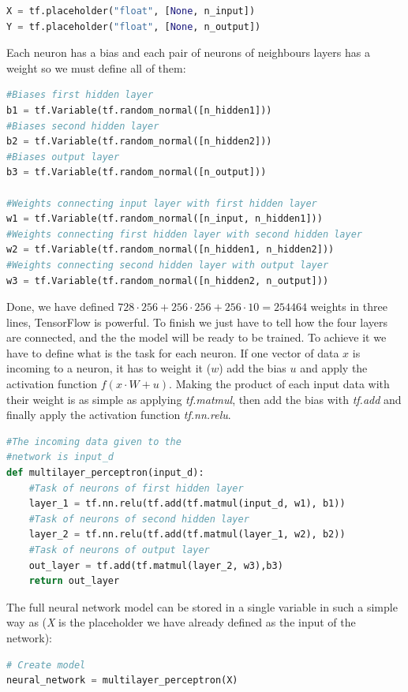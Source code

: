 \begin{lstlisting}[language=python]
X = tf.placeholder("float", [None, n_input])
Y = tf.placeholder("float", [None, n_output])
\end{lstlisting}

Each neuron has a bias and each pair of neurons of neighbours layers has a weight so we must define all of them:
\begin{lstlisting}[language=python]
#Biases first hidden layer
b1 = tf.Variable(tf.random_normal([n_hidden1]))
#Biases second hidden layer
b2 = tf.Variable(tf.random_normal([n_hidden2]))
#Biases output layer
b3 = tf.Variable(tf.random_normal([n_output]))

#Weights connecting input layer with first hidden layer
w1 = tf.Variable(tf.random_normal([n_input, n_hidden1]))
#Weights connecting first hidden layer with second hidden layer
w2 = tf.Variable(tf.random_normal([n_hidden1, n_hidden2]))
#Weights connecting second hidden layer with output layer
w3 = tf.Variable(tf.random_normal([n_hidden2, n_output]))
\end{lstlisting}

Done, we have defined $728\cdot256+256\cdot256+256\cdot10=254464$ weights in three lines, TensorFlow is powerful. To finish we just have to tell how the four layers are connected, and the the model will be ready to be trained. To achieve it we have to define what is the task for each neuron. If one vector of data $x$ is incoming to a neuron, it has to weight it ($w$) add the bias $u$ and apply the activation function $f(x\cdot W+u)$. Making the product of each input data with their weight is as simple as applying \textit{tf.matmul}, then add the bias with \textit{tf.add} and finally apply the activation function \textit{tf.nn.relu}.
\begin{lstlisting}[language=python]
#The incoming data given to the
#network is input_d
def multilayer_perceptron(input_d):
    #Task of neurons of first hidden layer
    layer_1 = tf.nn.relu(tf.add(tf.matmul(input_d, w1), b1))
    #Task of neurons of second hidden layer
    layer_2 = tf.nn.relu(tf.add(tf.matmul(layer_1, w2), b2))
    #Task of neurons of output layer
    out_layer = tf.add(tf.matmul(layer_2, w3),b3)
    return out_layer
\end{lstlisting}

The full neural network model can be stored in a single variable in such a simple way as (\textit{X} is the placeholder we have already defined as the input of the network):
\begin{lstlisting}[language=python]
# Create model
neural_network = multilayer_perceptron(X)
\end{lstlisting}
